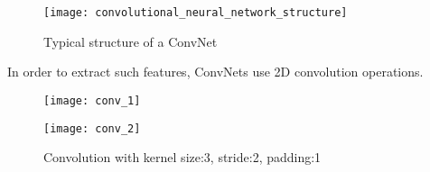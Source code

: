 \documentclass{report}
\begin{document}
\begin{figure}[h]
  \centering
  \texttt{[image: convolutional\_neural\_network\_structure]}
  \caption{Typical structure of a ConvNet}
\end{figure}

In order to extract such features, ConvNets use 2D convolution operations.

\begin{figure}[h]
  \centering
  \begin{minipage}[b]{0.4\textwidth}
    \texttt{[image: conv\_1]}
  \end{minipage}
  \hfill
  \begin{minipage}[b]{0.4\textwidth}
    \texttt{[image: conv\_2]}
  \end{minipage}
  \caption{Convolution with kernel size:3, stride:2, padding:1}

\end{figure}





\end{document}
